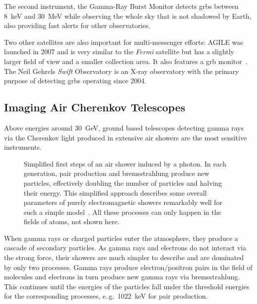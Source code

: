 The second instrument, the Gamma-Ray Burst Monitor detects \glspl{grb} 
between \SI{8}{\keV} and \SI{30}{\MeV} while observing the whole sky that is
not shadowed by Earth, also providing fast alerts for other observatories.

Two other satellites are also important for multi-messenger efforts:
AGILE was launched in 2007 and is very similar to the \textit{Fermi}
satellite but has a slightly larger field of view and a smaller collection area.
It also features a \gls{grb} monitor~\cite{agile}.
The Neil Gehrels \textit{Swift} Observatory is an X-ray observatory with the
primary purpose of detecting \glspl{grb} operating since 2004.


\subsection{Imaging Air Cherenkov Telescopes}\label{sec:iacts}

Above energies around \SI{30}{\GeV}, ground based telescopes
detecting gamma rays via the Cherenkov light produced in extensive air showers
are the most sensitive instruments.

\begin{figure}
  \raggedleft%
  
  \caption{%
    Simplified first steps of an air shower induced by a photon.
    In each generation, pair production and bremsstrahlung produce new particles,
    effectively doubling the number of particles and halving their energy.
    This simplified approach describes some overall parameters of purely electromagnetic
    showers remarkably well for such a simple model~\cite{heitler}.
    All these processes can only happen in the fields of atoms, not shown here.
  }\label{fig:heitler}
\end{figure}

When gamma rays or charged particles enter the atmosphere, 
they produce a cascade of secondary particles.
As gamma rays and electrons do not interact via the strong force,
their showers are much simpler to describe and are dominated by only two processes.
Gamma rays produce electron/positron pairs in the field of molecules and
electrons in turn produce new gamma rays via bremsstrahlung.
This continues until the energies of the particles fall under the threshold
energies for the corresponding processes, e.\,g.\ \SI{1022}{\keV} for pair production. 

